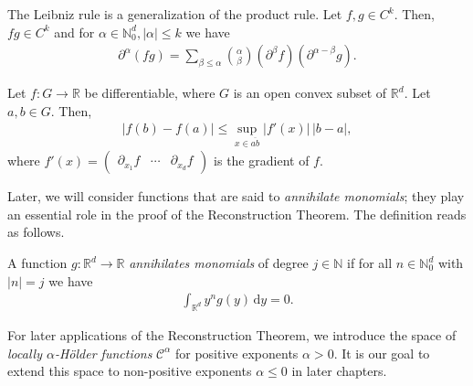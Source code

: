 \begin{theorem}\label{theorem:leibniz}
    The Leibniz rule is a generalization of the product rule. Let \( f, g \in {C}^k \). Then, \( fg \in {C}^k \) and for \( \alpha \in \mathbb{N}^d_0, |\alpha| \leq k \) we have
    \begin{align*}
        \partial^\alpha(fg) = \sum_{\beta \leq \alpha} \binom{\alpha}{\beta} (\partial^\beta f) (\partial^{\alpha - \beta} g).
    \end{align*}
\end{theorem}

\begin{theorem}\label{mean-value-inequality}
    Let \(f: G \to \mathbb{R}\) be differentiable, where \(G\) is an open convex subset of \(\mathbb{R}^d\). Let \(a,b \in G\). Then,
    \begin{align*}
        |f(b) - f(a)| \leq \sup\limits_{x \in \overline{ab}} |f'(x)| \, |b-a|,
    \end{align*}
    where 
    \(
        f'(x) = 
        \begin{pmatrix}
            \partial_{x_1}f & \cdots & \partial_{x_d}f
        \end{pmatrix}
    \)
    is the gradient of \(f\). 
\end{theorem}

Later, we will consider functions that are said to \emph{annihilate monomials}; they play an essential role in the proof of the Reconstruction Theorem. The definition reads as follows.

\begin{definition}
    A function \(g: \mathbb{R}^d \to \mathbb{R}\) \emph{annihilates monomials} of degree \(j \in \mathbb{N}\) if for all \(n \in \mathbb{N}^d_0\) with \(|n| = j\) we have
    \begin{align*}
        \int_{\mathbb{R}^d} y^n g (y) \, \mathrm{d}y = 0.
    \end{align*}
\end{definition}

For later applications of the Reconstruction Theorem, we introduce the space of \emph{locally \({\alpha}\)-Hölder functions} \(\mathcal{C}^{\alpha}\) for positive exponents \(\alpha > 0\). It is our goal to extend this space to non-positive exponents \({\alpha \leq 0}\) in later chapters. 

